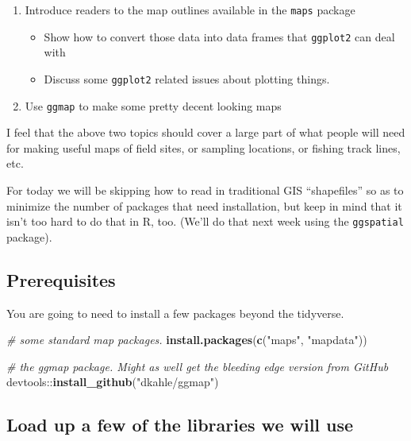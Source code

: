 \documentclass[]{book}
\newenvironment{Shaded}{\begin{snugshade}}{\end{snugshade}}
\newcommand{\KeywordTok}[1]{\textcolor[rgb]{0.13,0.29,0.53}{\textbf{{#1}}}}
\newcommand{\StringTok}[1]{\textcolor[rgb]{0.31,0.60,0.02}{{#1}}}
\newcommand{\CommentTok}[1]{\textcolor[rgb]{0.56,0.35,0.01}{\textit{{#1}}}}
\newcommand{\NormalTok}[1]{{#1}}
\providecommand{\tightlist}{%
  \setlength{\itemsep}{0pt}\setlength{\parskip}{0pt}}
\theoremstyle{definition}
\theoremstyle{definition}
\theoremstyle{remark}
\begin{document}
\begin{enumerate}
\def\labelenumi{\arabic{enumi}.}
\tightlist
\item
  Introduce readers to the map outlines available in the \texttt{maps}
  package

  \begin{itemize}
  \tightlist
  \item
    Show how to convert those data into data frames that
    \texttt{ggplot2} can deal with
  \item
    Discuss some \texttt{ggplot2} related issues about plotting things.
  \end{itemize}
\item
  Use \texttt{ggmap} to make some pretty decent looking maps
\end{enumerate}

I feel that the above two topics should cover a large part of what
people will need for making useful maps of field sites, or sampling
locations, or fishing track lines, etc.

For today we will be skipping how to read in traditional GIS
``shapefiles'' so as to minimize the number of packages that need
installation, but keep in mind that it isn't too hard to do that in R,
too. (We'll do that next week using the \texttt{ggspatial} package).

\subsection{Prerequisites}\label{prerequisites}

You are going to need to install a few packages beyond the tidyverse.

\begin{Shaded}
\begin{Highlighting}[]
\CommentTok{# some standard map packages.}
\KeywordTok{install.packages}\NormalTok{(}\KeywordTok{c}\NormalTok{(}\StringTok{"maps"}\NormalTok{, }\StringTok{"mapdata"}\NormalTok{))}

\CommentTok{# the ggmap package.  Might as well get the bleeding edge version from GitHub}
\NormalTok{devtools::}\KeywordTok{install_github}\NormalTok{(}\StringTok{"dkahle/ggmap"}\NormalTok{)}
\end{Highlighting}
\end{Shaded}

\subsection{Load up a few of the libraries we will
use}\label{load-up-a-few-of-the-libraries-we-will-use}
\end{document}
